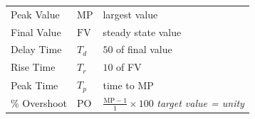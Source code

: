 \documentclass[
]{book}
\begin{document}
\begin{longtable}[]{@{}lll@{}}
\toprule
\endhead
\begin{minipage}[t]{0.30\columnwidth}\raggedright
Peak Value\strut
\end{minipage} & \begin{minipage}[t]{0.30\columnwidth}\raggedright
\(\mathrm{MP}\)\strut
\end{minipage} & \begin{minipage}[t]{0.30\columnwidth}\raggedright
largest value\strut
\end{minipage}\tabularnewline
\begin{minipage}[t]{0.30\columnwidth}\raggedright
Final Value\strut
\end{minipage} & \begin{minipage}[t]{0.30\columnwidth}\raggedright
\(\mathrm{FV}\)\strut
\end{minipage} & \begin{minipage}[t]{0.30\columnwidth}\raggedright
steady state value\strut
\end{minipage}\tabularnewline
\begin{minipage}[t]{0.30\columnwidth}\raggedright
Delay Time\strut
\end{minipage} & \begin{minipage}[t]{0.30\columnwidth}\raggedright
\(T_d\)\strut
\end{minipage} & \begin{minipage}[t]{0.30\columnwidth}\raggedright
\(50%
\) of final value\strut
\end{minipage}\tabularnewline
\begin{minipage}[t]{0.30\columnwidth}\raggedright
Rise Time\strut
\end{minipage} & \begin{minipage}[t]{0.30\columnwidth}\raggedright
\(T_r\)\strut
\end{minipage} & \begin{minipage}[t]{0.30\columnwidth}\raggedright
\(10%
\) of FV\strut
\end{minipage}\tabularnewline
\begin{minipage}[t]{0.30\columnwidth}\raggedright
Peak Time\strut
\end{minipage} & \begin{minipage}[t]{0.30\columnwidth}\raggedright
\(T_p\)\strut
\end{minipage} & \begin{minipage}[t]{0.30\columnwidth}\raggedright
time to MP\strut
\end{minipage}\tabularnewline
\begin{minipage}[t]{0.30\columnwidth}\raggedright
\% Overshoot\strut
\end{minipage} & \begin{minipage}[t]{0.30\columnwidth}\raggedright
\(\mathrm{PO}\)\strut
\end{minipage} & \begin{minipage}[t]{0.30\columnwidth}\raggedright
\(\frac{\mathrm{MP} - 1}{1} \times 100%
\) \emph{target value = unity}\strut
\end{minipage}\tabularnewline
\bottomrule
\end{longtable}
\end{document}
